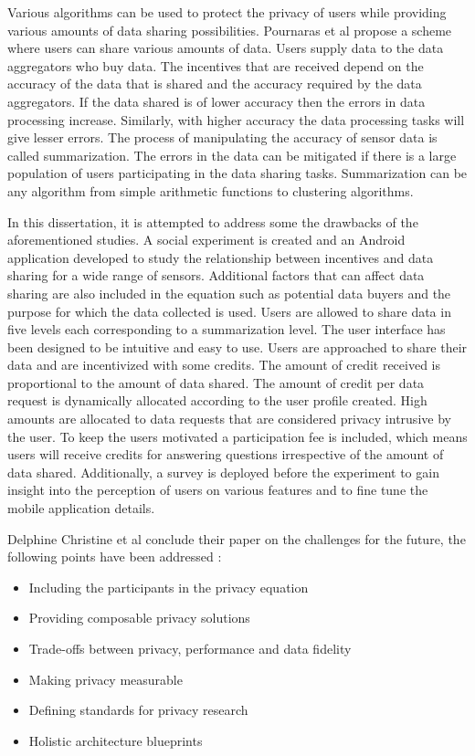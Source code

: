 Various algorithms can be used to protect the privacy of users while providing various amounts of data sharing possibilities. Pournaras et al \cite{pournaras2016self} propose a scheme where users can share various amounts of data. Users supply data to the data aggregators who buy data. The incentives that are received depend on the accuracy of the data that is shared and the accuracy required by the data aggregators. If the data shared is of lower accuracy then the errors in data processing increase. Similarly, with higher accuracy the data processing tasks will give lesser errors. The process of manipulating the accuracy of sensor data is called summarization. The errors in the data can be mitigated if there is a large population of users participating in the data sharing tasks. Summarization can be any algorithm from simple arithmetic functions to clustering algorithms.

In this dissertation, it is attempted to address some the drawbacks of the aforementioned studies. A social experiment is created and an Android application developed to study the relationship between incentives and data sharing for a wide range of sensors.
Additional factors that can affect data sharing are also included in the equation such as potential data buyers and the purpose for which the data collected is used. Users are allowed to share data in five levels each corresponding to a summarization level. The user interface has been designed to be intuitive and easy to use. Users are approached to share their data and are incentivized with some credits. The amount of credit received is proportional to the amount of data shared. The amount of credit per data request is dynamically allocated according to the user profile created. High amounts are allocated to data requests that are considered privacy intrusive by the user. To keep the users motivated a participation fee is included, which means users will receive credits for answering questions irrespective of the amount of data shared.
Additionally, a survey is deployed before the experiment to gain insight into the perception of users on various features and to fine tune the mobile application details.

Delphine Christine et al \cite{christin2016privacy} conclude their paper on the challenges for the future, the following points have been addressed \cite{pournarasethical}:

\begin{itemize}
\item Including the participants in the privacy equation
\item Providing composable privacy solutions
\item Trade-offs between privacy, performance and data fidelity
\item Making privacy measurable
\item Defining standards for privacy research
\item Holistic architecture blueprints
\end{itemize}



